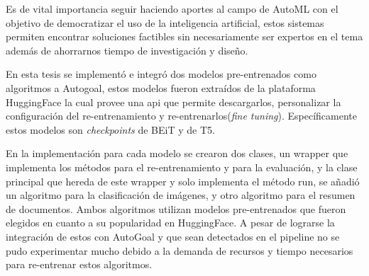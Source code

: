 \begin{conclusions}
    Es de vital importancia seguir haciendo aportes al campo de AutoML con el objetivo de democratizar el uso de la inteligencia artificial, estos sistemas permiten encontrar soluciones factibles sin necesariamente ser expertos en el tema además de ahorrarnos tiempo de investigación y diseño.

    En esta tesis se implementó e integró dos modelos pre-entrenados como algoritmos a Autogoal, estos modelos fueron extraídos de la plataforma HuggingFace la cual provee una api que permite descargarlos, personalizar la configuración del re-entrenamiento y re-entrenarlos(\textit{fine tuning}). Específicamente estos modelos son \textit{checkpoints} de BEiT y de T5. 

    En la implementación para cada modelo se crearon dos clases, un wrapper que implementa los métodos para el re-entrenamiento y para la evaluación, y la clase principal que hereda de este wrapper y solo implementa el método run, se añadió un algoritmo para la clasificación de imágenes, y otro algoritmo para el resumen de documentos. Ambos algoritmos utilizan modelos pre-entrenados que fueron elegidos en cuanto a su popularidad en HuggingFace. A pesar de lograrse la integración de estos con AutoGoal y que sean detectados en el pipeline no se pudo experimentar mucho debido a la demanda de recursos y tiempo necesarios para re-entrenar estos algoritmos.
\end{conclusions}
